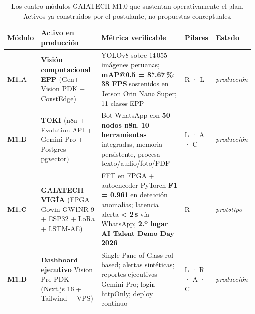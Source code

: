 \documentclass[12pt,a4paper]{article}
\renewcommand{\arraystretch}{1.20}
\begin{document}
\begin{table}[h]
\centering\footnotesize
\setlength{\tabcolsep}{3.5pt}
\renewcommand{\arraystretch}{1.15}
\begin{tabularx}{\linewidth}{@{}p{0.85cm} >{\raggedright\arraybackslash}p{3.6cm} >{\raggedright\arraybackslash}X p{1.6cm} p{1.8cm}@{}}
\toprule
\textbf{Módulo} & \textbf{Activo en producción} & \textbf{Métrica verificable} & \textbf{Pilares} & \textbf{Estado} \\
\midrule
\textbf{M1.A} & \textbf{Visión computacional EPP} (Gen+ Vision PDK + ConstEdge) & YOLOv8 sobre 14\,055 imágenes peruanas; \textbf{mAP@0.5 = 87.67\,\%}; \textbf{38 FPS} sostenidos en Jetson Orin Nano Super; 11 clases EPP & R · L & \textit{producción} \\
\textbf{M1.B} & \textbf{TOKI} (n8n + Evolution API + Gemini Pro + Postgres pgvector) & Bot WhatsApp con \textbf{50 nodos n8n}, \textbf{10 herramientas} integradas, memoria persistente, procesa texto/audio/foto/PDF & L · A · C & \textit{producción} \\
\textbf{M1.C} & \textbf{GAIATECH VIGÍA} (FPGA Gowin GW1NR-9 + ESP32 + LoRa + LSTM-AE) & FFT en FPGA + autoencoder PyTorch \textbf{F1 = 0.961} en detección anomalías; latencia alerta \textbf{< 2\,s} vía WhatsApp; \textbf{2.º lugar AI Talent Demo Day 2026} & R & \textit{prototipo} \\
\textbf{M1.D} & \textbf{Dashboard ejecutivo} Vision Pro PDK (Next.js 16 + Tailwind + VPS) & Single Pane of Glass rol-based; alertas sintéticas; reportes ejecutivos Gemini Pro; login httpOnly; deploy continuo & L · R · A · C & \textit{producción} \\
\bottomrule
\end{tabularx}
\caption{Los cuatro módulos GAIATECH M1.0 que sustentan operativamente el plan. Activos ya construidos por el postulante, no propuestas conceptuales.}
\label{tab:gaiatech}
\end{table}
\end{document}

